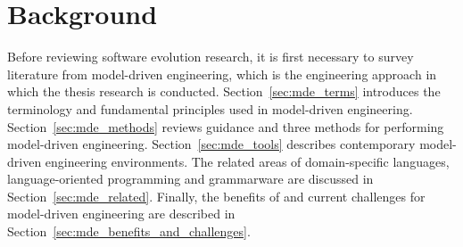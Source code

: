 
\chapter{Background}
\label{Background}

Before reviewing software evolution research, it is first necessary to survey literature from model-driven engineering, which is the engineering approach in which the thesis research is conducted. Section~\ref{sec:mde_terms} introduces the terminology and fundamental principles used in model-driven engineering. Section~\ref{sec:mde_methods} reviews guidance and three methods for performing model-driven engineering. Section~\ref{sec:mde_tools} describes contemporary model-driven engineering environments. The related areas of domain-specific languages, language-oriented programming and grammarware are discussed in Section~\ref{sec:mde_related}. Finally, the benefits of and current challenges for model-driven engineering are described in Section~\ref{sec:mde_benefits_and_challenges}.





